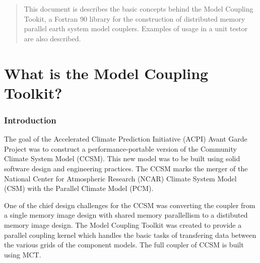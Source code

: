 \documentclass{article}
\begin{document}
\vspace*{\fill}


\newpage
\setcounter{page}{3}     %

\vspace*{\fill}

\begin{abstract}
This document is describes the basic concepts behind the Model
Coupling Tookit, a Fortran 90 library for the construction of
distributed memory parallel earth system model couplers.   Examples
of usage in a unit testor are also described.
\end{abstract}

\vspace*{\fill}
\newpage

\tableofcontents
\newpage



\part{What is the Model Coupling Toolkit?}

\section{Introduction}

The goal of the Accelerated Climate Prediction Initiative (ACPI)
Avant Garde Project was to construct a performance-portable
version of the Community Climate System Model (CCSM).  This new
model was to be built using solid software design and engineering
practices.  The CCSM marks the merger of the National Center for
Atmospheric Research (NCAR) Climate System Model (CSM) with the
Parallel Climate Model (PCM).   

One of the chief design
challenges for the CCSM was converting the coupler from a single
memory image design with shared memory parallellism to a distibuted memory 
image design.  The Model Coupling Toolkit was created to provide
a parallel coupling kernel which handles the basic tasks of transfering
data between the various grids of the component models.  The full
coupler of CCSM is built using MCT.

\end{document}
